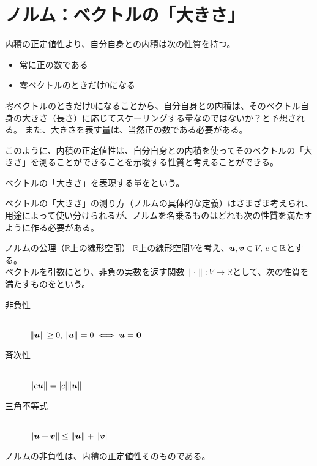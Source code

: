 \documentclass[../../../topic_linear-algebra]{subfiles}
\begin{document}
\sectionline
\section{ノルム：ベクトルの「大きさ」}

内積の正定値性より、自分自身との内積は次の性質を持つ。
\begin{itemize}
  \item 常に正の数である
  \item 零ベクトルのときだけ0になる
\end{itemize}

零ベクトルのときだけ0になることから、自分自身との内積は、そのベクトル自身の大きさ（長さ）に応じてスケーリングする量なのではないか？と予想される。
また、大きさを表す量は、当然正の数である必要がある。

\br

このように、内積の正定値性は、自分自身との内積を使ってそのベクトルの「大きさ」を測ることができることを示唆する性質と考えることができる。

\br

ベクトルの「大きさ」を表現する量をという。

\br

ベクトルの「大きさ」の測り方（ノルムの具体的な定義）はさまざま考えられ、用途によって使い分けられるが、ノルムを名乗るものはどれも次の性質を満たすように作る必要がある。

\begin{definition}{ノルムの公理（$\mathbb{R}$上の線形空間）}
  $\mathbb{R}$上の線形空間$V$を考え、$\vb*{u}, \vb*{v} \in V,\, c \in \mathbb{R} $とする。\\
  ベクトルを引数にとり、非負の実数を返す関数$\|\cdot\|: V \to \mathbb{R}$として、次の性質を満たすものをという。
  \begin{description}
    \item[非負性]~\\
          $\|\vb*{u}\| \geq 0, \|\vb*{u}\| = 0 \iff \vb*{u} = \vb*{0}$
    \item[斉次性]~\\
          $\|c\vb*{u}\| = |c|\|\vb*{u}\|$
    \item[三角不等式]~\\
          $\|\vb*{u} + \vb*{v}\| \leq \|\vb*{u}\| + \|\vb*{v}\|$
  \end{description}
\end{definition}

ノルムの非負性は、内積の正定値性そのものである。
\end{document}
